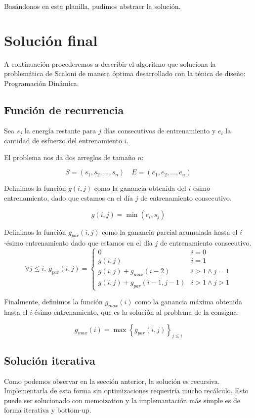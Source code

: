 Basándonos en esta planilla, pudimos abstraer la solución.

\section{Solución final}

A continuación procederemos a describir el algoritmo que soluciona la problemática de Scaloni de
manera óptima desarrollado con la ténica de diseño: Programación Dinámica.

\subsection{Función de recurrencia}

Sea $s_{j}$ la energía restante para $j$ días consecutivos de entrenamiento y
$e_{i}$ la cantidad de esfuerzo del entrenamiento $i$.

El problema nos da dos arreglos de tamaño $n$:

$$
S = (s_{1},s_{2},\dots ,s_{n}) \quad E=(e_{1},e_{2},\dots ,e_{n})
$$

Definimos la función $g(i,j)$ como la ganancia obtenida del $i$-ésimo entrenamiento,
dado que estamos en el día $j$ de entrenamiento consecutivo.

$$
g(i,j)=\min{(e_{i},s_{j})}
$$

Definimos la función $g_{par}(i,j)$ como la ganancia parcial acumulada hasta el $i$-ésimo entrenamiento
dado que estamos en el día $j$ de entrenamiento consecutivo.
$$
\forall j\leq i,\  g_{par}(i,j)=\begin{cases}
0 & i=0 \\
g(i,j) & i=1 \\
g(i,j)+g_{max}(i-2) & i>1 \land j=1 \\
g(i,j)+g_{par}(i-1,j-1) & i>1 \land j>1
\end{cases}
$$

Finalmente, definimos la función $g_{max}(i)$ como la ganancia máxima obtenida hasta el $i$-ésimo
entrenamiento, que es la solución al problema de la consigna.

$$
g_{max}(i)=\max{\left\{ g_{par}(i,j) \right\}_{j\leq i}}
$$

\subsection{Solución iterativa}

Como podemos observar en la sección anterior, la solución es recursiva. Implementarla de esta forma sin
optimizaciones requeriría mucho recálculo. Esto puede ser solucionado con memoization y la implemantación más
simple es de forma iterativa y bottom-up.

